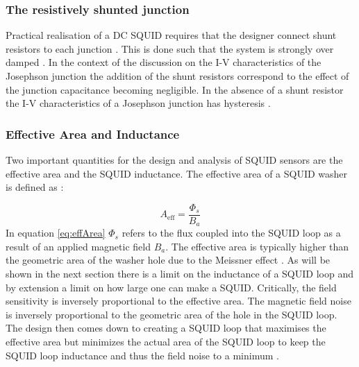 \subsubsection*{The resistively shunted junction}
Practical realisation of a DC SQUID requires that the designer connect shunt resistors to each junction \cite{Drung2016NBSQUIDS}. This is done such that the system is strongly over damped \cite{SQUIDhandbook}. In the context of the discussion on the I-V characteristics  of the Josephson junction the addition of the shunt resistors correspond to the effect of the junction capacitance becoming negligible. In the absence of a shunt resistor the I-V characteristics of a Josephson junction has hysteresis \cite{Drung2016NBSQUIDS}. 

\subsubsection*{Effective Area and Inductance}
Two important quantities for the design and analysis of SQUID sensors are the effective area and the SQUID inductance. The effective area of a SQUID washer is defined as \cite{SQUIDhandbook}:

\begin{equation}
    A_{\text{eff}} = \frac{\Phi_s}{B_a}
    \label{eq:effArea}
\end{equation}
In equation \ref{eq:effArea} $\Phi_s$ refers to the flux coupled into the SQUID loop as a result of an applied magnetic field $B_a$. The effective area is typically higher than the geometric area of the washer hole due to the Meissner effect \cite{Drung2016NBSQUIDS}. As will be shown in the next section there is a limit on the inductance of a SQUID loop and by extension a limit on how large one can make a SQUID. Critically, the field sensitivity is inversely proportional to the effective area. The magnetic field noise is inversely proportional to the geometric area of the hole in the SQUID loop. The design then comes down to creating a SQUID loop that maximises the effective area but minimizes the actual area of the SQUID loop to keep the SQUID loop inductance and thus the field noise to a minimum \cite{SQUIDhandbook}.

